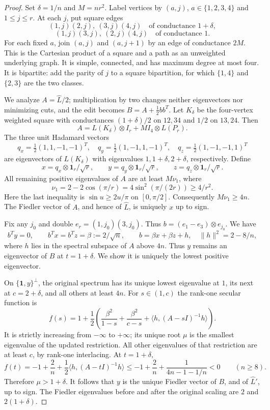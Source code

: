 \documentclass[11pt]{article}
\newcommand{\one}{\boldsymbol 1}
\begin{document}
\begin{proof}
Set $\delta=1/n$ and $M=nr^2$. Label vertices by $(a,j)$,
$a\in\{1,2,3,4\}$ and $1\le j\le r$. At each $j$, put square edges
\[
 (1,j)(2,j),\ (3,j)(4,j)\quad\text{of conductance }1+\delta,
\]
\[
 (1,j)(3,j),\ (2,j)(4,j)\quad\text{of conductance }1.
\]
For each fixed $a$, join $(a,j)$ and $(a,j+1)$ by an edge of
conductance $2M$. This is the Cartesian product of a square and a
path as an unweighted underlying graph. It is simple, connected,
and has maximum degree at most four. It is bipartite: add the parity
of $j$ to a square bipartition, for which $\{1,4\}$ and $\{2,3\}$
are the two classes.

We analyze $A=\widehat L/2$; multiplication by two changes neither
eigenvectors nor minimizing cuts, and the edit becomes
$B=A+\frac12bb^T$. Let $K_\delta$ be the four-vertex weighted square
with conductances $(1+\delta)/2$ on $12,34$ and $1/2$ on $13,24$.
Then
\[
 A=L(K_\delta)\otimes I_r+M I_4\otimes L(P_r).
\]
The three unit Hadamard vectors
\[
 q_x=\tfrac12(1,1,-1,-1)^T,\quad
 q_y=\tfrac12(1,-1,1,-1)^T,\quad
 q_z=\tfrac12(1,-1,-1,1)^T
\]
are eigenvectors of $L(K_\delta)$ with eigenvalues
$1,1+\delta,2+\delta$, respectively. Define
\[
 x=q_x\otimes\one_r/\sqrt r,\qquad
 y=q_y\otimes\one_r/\sqrt r,\qquad
 z=q_z\otimes\one_r/\sqrt r.
\]
All remaining positive eigenvalues of $A$ are at least
$M\nu_1$, where
\[
 \nu_1=2-2\cos(\pi/r)=4\sin^2(\pi/(2r))\ge4/r^2.
\]
Here the last inequality is $\sin u\ge2u/\pi$ on $[0,\pi/2]$.
Consequently $M\nu_1\ge4n$. The Fiedler vector of $A$, and hence
of $\widehat L$, is uniquely $x$ up to sign.

Fix any $j_0$ and double $e_r=(1,j_0)(3,j_0)$. Thus
$b=(e_1-e_3)\otimes e_{j_0}$. We have
\[
 b^Ty=0,\qquad b^Tx=b^Tz=\beta:=2/\sqrt n,
 \qquad b=\beta x+\beta z+h,
 \quad \|h\|^2=2-8/n,
\]
where $h$ lies in the spectral subspace of $A$ above $4n$.
Thus $y$ remains an eigenvector of $B$ at $t=1+\delta$.
We show it is uniquely the lowest positive eigenvector.

On $\{\one,y\}^\perp$, the original spectrum has its unique lowest
eigenvalue at $1$, its next at $c=2+\delta$, and all others at least
$4n$. For $s\in(1,c)$ the rank-one secular function is
\[
 f(s)=1+\frac12\left(
    \frac{\beta^2}{1-s}+\frac{\beta^2}{c-s}
    +\langle h,(A-sI)^{-1}h\rangle\right).
\]
It is strictly increasing from $-\infty$ to $+\infty$; its unique
root $\mu$ is the smallest eigenvalue of the updated restriction.
All other eigenvalues of that restriction are at least $c$, by
rank-one interlacing. At $t=1+\delta$,
\[
 f(t)
 =-1+\frac2n+\frac12\langle h,(A-tI)^{-1}h\rangle
 \le-1+\frac2n+\frac1{4n-1-1/n}<0\qquad(n\ge8).
\]
Therefore $\mu>1+\delta$. It follows that $y$ is the unique Fiedler
vector of $B$, and of $\widehat L'$, up to sign. The Fiedler
eigenvalues before and after the original scaling are
$2$ and $2(1+\delta)$.


\end{proof}
\end{document}
